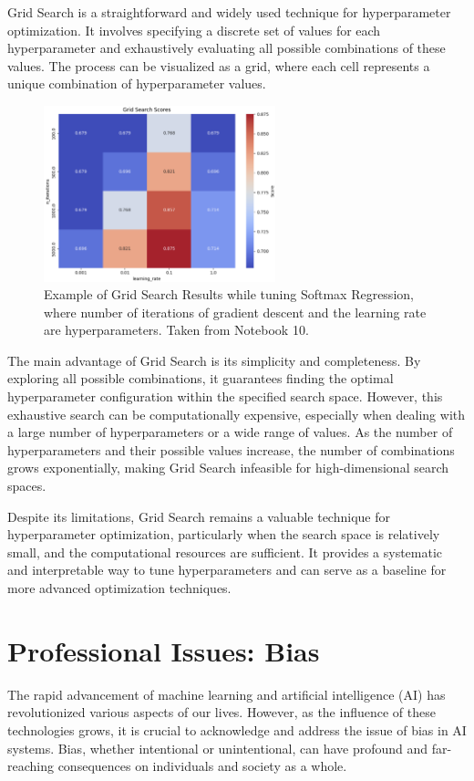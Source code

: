 \documentclass[letterpaper,10pt]{article}
\begin{document}
Grid Search is a straightforward and widely used technique for hyperparameter optimization. It involves specifying a discrete set of values for each hyperparameter and exhaustively evaluating all possible combinations of these values. The process can be visualized as a grid, where each cell represents a unique combination of hyperparameter values. \par

\begin{figure}[ht]
    \centering
    \includegraphics[width=0.6\textwidth]{grid-search.png}
    \caption{Example of Grid Search Results while tuning Softmax Regression, where number of iterations of gradient descent and the learning rate are hyperparameters. Taken from Notebook 10.}
    \label{fig:grid-search}
\end{figure}

The main advantage of Grid Search is its simplicity and completeness. By exploring all possible combinations, it guarantees finding the optimal hyperparameter configuration within the specified search space. However, this exhaustive search can be computationally expensive, especially when dealing with a large number of hyperparameters or a wide range of values. As the number of hyperparameters and their possible values increase, the number of combinations grows exponentially, making Grid Search infeasible for high-dimensional search spaces.\par

Despite its limitations, Grid Search remains a valuable technique for hyperparameter optimization, particularly when the search space is relatively small, and the computational resources are sufficient. It provides a systematic and interpretable way to tune hyperparameters and can serve as a baseline for more advanced optimization techniques.\par

\newpage
\section{Professional Issues: Bias}
The rapid advancement of machine learning and artificial intelligence (AI) has revolutionized various aspects of our lives. However, as the influence of these technologies grows, it is crucial to acknowledge and address the issue of bias in AI systems. Bias, whether intentional or unintentional, can have profound and far-reaching consequences on individuals and society as a whole. \par
\end{document}
